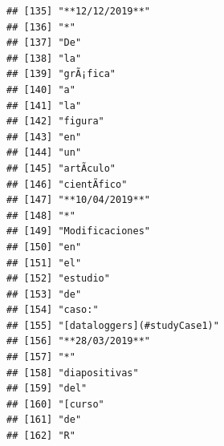 \documentclass[
]{book}
\begin{document}
\begin{verbatim}
## [135] "**12/12/2019**"                                                                   
## [136] "*"                                                                                
## [137] "De"                                                                               
## [138] "la"                                                                               
## [139] "grÃ¡fica"                                                                         
## [140] "a"                                                                                
## [141] "la"                                                                               
## [142] "figura"                                                                           
## [143] "en"                                                                               
## [144] "un"                                                                               
## [145] "artÃ­culo"                                                                        
## [146] "cientÃ­fico"                                                                      
## [147] "**10/04/2019**"                                                                   
## [148] "*"                                                                                
## [149] "Modificaciones"                                                                   
## [150] "en"                                                                               
## [151] "el"                                                                               
## [152] "estudio"                                                                          
## [153] "de"                                                                               
## [154] "caso:"                                                                            
## [155] "[dataloggers](#studyCase1)"                                                       
## [156] "**28/03/2019**"                                                                   
## [157] "*"                                                                                
## [158] "diapositivas"                                                                     
## [159] "del"                                                                              
## [160] "[curso"                                                                           
## [161] "de"                                                                               
## [162] "R"                                                                                

\end{verbatim}
\end{document}
